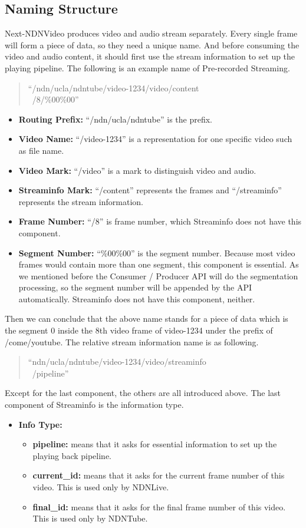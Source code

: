 \subsection{Naming Structure}
Next-NDNVideo produces video and audio stream separately. Every single frame will form a piece of data, so they need a unique name. And before consuming the video and audio content, it should first use the stream information to set up the playing pipeline. The following is an example name of Pre-recorded Streaming. 
\begin{quote}
``/ndn/ucla/ndntube/video-1234/video/content \\\ /8/\%00\%00''
\end{quote}
\begin{itemize}
	\item{\textbf{Routing Prefix:}} ``/ndn/ucla/ndntube'' is the prefix.
	\item{\textbf{Video Name:}} ``/video-1234'' is a representation for one specific video such as file name.
	\item{\textbf{Video Mark:}} ``/video'' is a mark to distinguish video and audio.
	\item{\textbf{Streaminfo Mark:}} ``/content'' represents the frames and ``/streaminfo'' represents the stream information.
	\item{\textbf{Frame Number:}} ``/8'' is frame number, which Streaminfo does not have this component.
	\item{\textbf{Segment Number:}} ``\%00\%00'' is the segment number. Because most video frames would contain more than one segment, this component is essential. As we mentioned before the Consumer / Producer API will do the segmentation processing, so the segment number will be appended by the API automatically. Streaminfo does not have this component, neither.
\end{itemize}

Then we can conclude that the above name stands for a piece of data which is the segment 0 inside the 8th video frame of video-1234 under the prefix of /come/youtube. The relative stream information name is as following.
\begin{quote}
``ndn/ucla/ndntube/video-1234/video/streaminfo \\\ /pipeline''
\end{quote}

Except for the last component, the others are all introduced above. The last component of Streaminfo is the information type.
\begin{itemize}
	\item{\textbf{Info Type:}} 
	\begin{itemize}
		\item{\textbf{pipeline:}} means that it asks for essential information to set up the playing back pipeline. 
		\item{\textbf{current\_id:}} means that it asks for the current frame number of this video. This is used only by NDNLive.
		\item{\textbf{final\_id:}} means that it asks for the final frame number of this video. This is used only by NDNTube. 
	\end{itemize}
\end{itemize}


